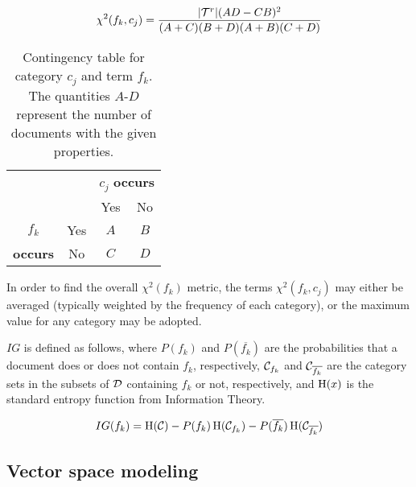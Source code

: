 \begin{align*}
\chi^2(f_k,c_j) & = \frac{|\mathcal{T}^r|(AD-CB)^2}{(A+C)(B+D)(A+B)(C+D)} \\
\end{align*}


\begin{table}
\begin{center}
\begin{tabular}{|c|c|c|c|}
\cline{3-4}
\multicolumn{2}{c|}{} & \multicolumn{2}{c|}{$c_j$ \textbf{occurs}} \\
\cline{3-4}
\multicolumn{2}{c|}{} & Yes & No \\
\hline
$f_k$           & Yes & $A$ & $B$ \\
\cline{2-4}
\textbf{occurs} & No  & $C$ & $D$ \\
\hline
\end{tabular}
\end{center}
\caption{Contingency table for category $c_j$ and term $f_k$.  The
  quantities $A$-$D$ represent the number of documents with the given
  properties.}
\label{termcat-contingency}
\end{table}

In order to find the overall $\chi^2(f_k)$ metric, the terms
$\chi^2(f_k,c_j)$ may either be averaged (typically weighted by the
frequency of each category), or the maximum value for any category may
be adopted.\cite{yang:97}

$IG$ is defined as follows, where $P(f_k)$ and $P(\overline{f_k})$ are
the probabilities that a document does or does not contain $f_k$,
respectively, $\mathcal{C}_{f_k}$ and $\mathcal{C}_{\overline{f_k}}$ are the
category sets in the subsets of $\mathcal{D}$ containing $f_k$ or not,
respectively, and $\operatorname{H}(x)$ is the standard entropy function from
Information Theory. \cite[ch. 2]{manning:99}

\begin{equation*}
        IG(f_k) = \operatorname{H}(\mathcal{C})
                  - P(f_k) \operatorname{H}(\mathcal{C}_{f_k})
	          - P(\overline{f_k}) \operatorname{H}(\mathcal{C}_{\overline{f_k}})
\end{equation*}


\subsection{Vector space modeling}


